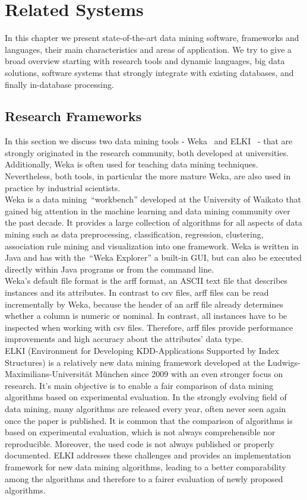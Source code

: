 \chapter{Related Systems}\label{chapter:related}

In this chapter we present state-of-the-art data mining software, frameworks and languages, their main characteristics and areas of application. We try to give a broad overview starting with research tools and dynamic languages, big data solutions, software systems that strongly integrate with existing databases, and finally in-database processing.

\section{Research Frameworks}
In this section we discuss two data mining tools - Weka~\parencite{Hall:2009:WDM:1656274.1656278} and ELKI~\parencite{DBLP:conf/ssdbm/AchtertKZ08} - that are strongly originated in the research community, both developed at universities. Additionally, Weka is often used for teaching data mining techniques. Nevertheless, both tools, in particular the more mature Weka, are also used in practice by industrial scientists.
\\
Weka is a data mining~\enquote{workbench} developed at the University of Waikato that gained big attention in the machine learning and data mining community over the past decade. It provides a large collection of algorithms for all aspects of data mining such as data preprocessing, classification, regression, clustering, association rule mining and visualization into one framework. Weka is written in Java and has with the~\enquote{Weka Explorer} a built-in GUI, but can also be executed directly within Java programs or from the command line. 
\\
Weka's default file format is the arff format, an ASCII text file that describes instances and its attributes. In contrast to csv files, arff files can be read incrementally by Weka, because the header of an arff file already determines whether a column is numeric or nominal. In contrast, all instances have to be inspected when working with csv files. Therefore, arff files provide performance improvements and high accuracy about the attributes' data type.
\\
ELKI (Environment for Developing KDD-Applications Supported by Index Structures) is a relatively new data mining framework developed at the Ludwigs-Maximilians-Universität München since 2009 with an even stronger focus on research. It's main objective is to enable a fair comparison of data mining algorithms based on experimental evaluation. In the strongly evolving field of data mining, many algorithms are released every year, often never seen again once the paper is published. It is common that the comparison of algorithms is based on experimental evaluation, which is not always comprehensible nor reproducible. Moreover, the used code is not always published or properly documented. ELKI addresses these challenges and provides an implementation framework for new data mining algorithms, leading to a better comparability among the algorithms and therefore to a fairer evaluation of newly proposed algorithms. 

